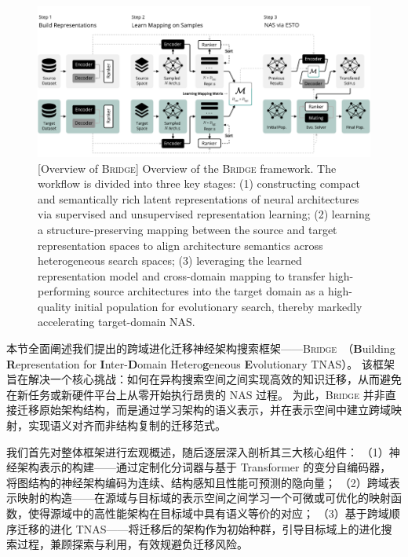 \documentclass[../main.tex]{subfiles}
\begin{document}
\begin{figure}[htbp]
	\centering
	\includegraphics[width=\textwidth]{BRIDGE/overview-fixed.pdf}
	[Overview of \textsc{Bridge}]{
		Overview of the \textsc{Bridge} framework.
		The workflow is divided into three key stages:
		(1) constructing compact and semantically rich latent representations of neural architectures via supervised and unsupervised representation learning;
		(2) learning a structure-preserving mapping between the source and target representation spaces to align architecture semantics across heterogeneous search spaces;
		(3) leveraging the learned representation model and cross-domain mapping to transfer high-performing source architectures into the target domain as a high-quality initial population for evolutionary search, thereby markedly accelerating target-domain NAS.
	}\label{fig:overview}
\end{figure}

本节全面阐述我们提出的跨域进化迁移神经架构搜索框架——\textsc{Bridge}~（\textbf{B}uilding \textbf{R}epresentation for \textbf{I}nter-\textbf{D}omain Hetero\textbf{g}eneous \textbf{E}volutionary TNAS）。
该框架旨在解决一个核心挑战：如何在异构搜索空间之间实现高效的知识迁移，从而避免在新任务或新硬件平台上从零开始执行昂贵的 NAS 过程。
为此，\textsc{Bridge} 并非直接迁移原始架构结构，而是通过学习架构的语义表示，并在表示空间中建立跨域映射，实现语义对齐而非结构复制的迁移范式。

我们首先对整体框架进行宏观概述，随后逐层深入剖析其三大核心组件：
（1）神经架构表示的构建——通过定制化分词器与基于 Transformer 的变分自编码器，将图结构的神经架构编码为连续、结构感知且性能可预测的隐向量；
（2）跨域表示映射的构造——在源域与目标域的表示空间之间学习一个可微或可优化的映射函数，使得源域中的高性能架构在目标域中具有语义等价的对应；
（3）基于跨域顺序迁移的进化 TNAS——将迁移后的架构作为初始种群，引导目标域上的进化搜索过程，兼顾探索与利用，有效规避负迁移风险。
\end{document}
